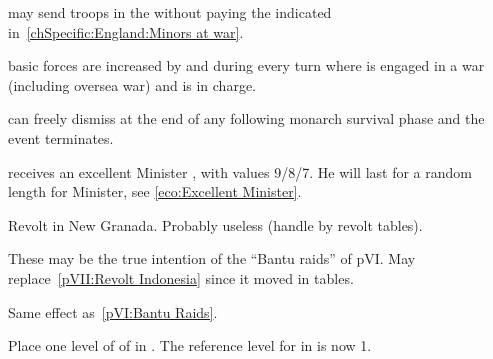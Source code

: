 \phdipl
\aparag \ANG may send \VASSAL troops in the \ROTW without paying the \STAB
indicated in~\ref{chSpecific:England:Minors at war}.

\phadm
\aparag \ANG basic forces are increased by \FLEET\facemoins and \ARMY\faceplus
during every turn where \ANG is engaged in a war (including oversea war) and
\ministrePitt is in charge.





\aparag \AUS can freely dismiss \ministreKaunitz at the end of any following
monarch survival phase and the event terminates.

\phevnt
\aparag \AUS receives an excellent Minister \ministreKaunitz, with values
9/8/7.  He will last for a random length for Minister, see \ref{eco:Excellent
  Minister}.


\begin{todo}
  Revolt in New Granada. Probably useless (handle by revolt tables).
\end{todo}


\begin{todo}
  These may be the true intention of the ``Bantu raids'' of pVI. May
  replace~\ref{pVII:Revolt Indonesia} since it moved in \REVOLT tables.

  Same effect as~\ref{pVI:Bantu Raids}.
\end{todo}




\effetlong
\aparag Place one level of \TradeFLEET of \paysusa in .
\bparag The reference level for \paysusa in  is now 1.

